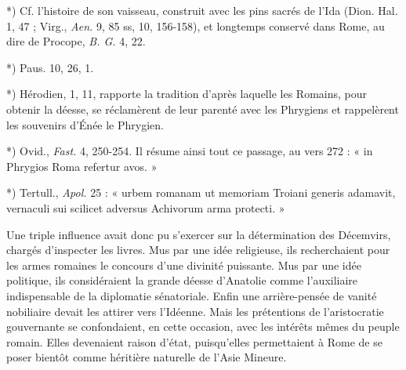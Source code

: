 \documentclass[a4paper, 11pt, oneside, polutonikogreek, french]{article}
\begin{document}
*) Cf. l'histoire de son vaisseau, construit avec les pins sacrés de l'Ida (Dion. Hal. 1, 47 ; Virg., \emph{Aen.} 9, 85 ss, 10, 156-158), et longtemps conservé dans Rome, au dire de Procope, \emph{B. G.} 4, 22.

*) Paus. 10, 26, 1.

*) Hérodien, 1, 11, rapporte la tradition d'après laquelle les Romains, pour obtenir la déesse, se réclamèrent de leur parenté avec les Phrygiens et rappelèrent les souvenirs d'Énée le Phrygien.

*) Ovid., \emph{Fast.} 4, 250-254. Il résume ainsi tout ce passage, au vers 272 : « in Phrygios Roma refertur avos. »

*) Tertull., \emph{Apol.} 25 : « urbem romanam ut memoriam Troiani generis adamavit, vernaculi sui scilicet adversus Achivorum arma protecti. »

Une triple influence avait donc pu s'exercer sur la détermination des Décemvirs, chargés d'inspecter les livres. Mus par une idée religieuse, ils recherchaient pour les armes romaines le concours d'une divinité puissante. Mus par une idée politique, ils considéraient la grande déesse d'Anatolie comme l'auxiliaire indispensable de la diplomatie sénatoriale. Enfin une arrière-pensée de vanité nobiliaire devait les attirer vers l'Idéenne. Mais les prétentions de l'aristocratie gouvernante se confondaient, en cette occasion, avec les intérêts mêmes du peuple romain. Elles devenaient raison d'état, puisqu'elles permettaient à Rome de se poser bientôt comme héritière naturelle de l'Asie Mineure.
\end{document}
